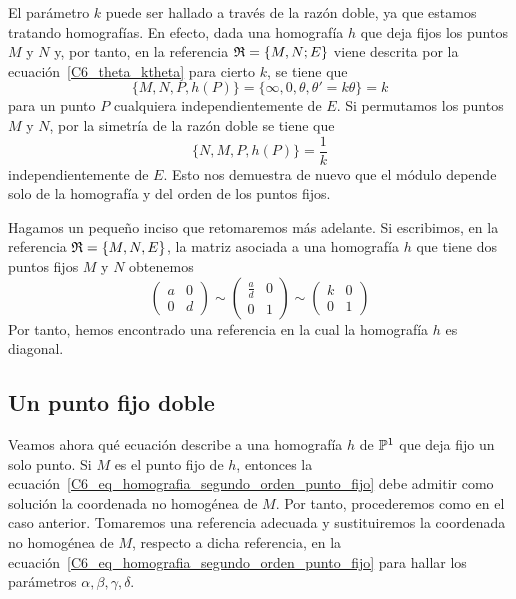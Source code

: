 El parámetro $k$ puede ser hallado a través de la razón doble, ya que estamos tratando homografías. En efecto, dada una homografía $h$ que deja fijos los puntos $M$ y $N$ y, por tanto, en la referencia $\mathfrak{R}=\{M,N;E\}$ viene descrita por la ecuación~\eqref{C6_theta_ktheta} para cierto $k$, se tiene que
\begin{equation}
	\{M,N,P,h(P)\}=\{\infty,0,\theta,\theta'=k\theta\}=k
\end{equation}
para un punto $P$ cualquiera independientemente de $E$. Si permutamos los puntos $M$ y $N$, por la simetría de la razón doble se tiene que
\begin{equation}
	\{N,M,P,h(P)\}=\frac{1}{k}
\end{equation}
independientemente de $E$. Esto nos demuestra de nuevo que el módulo depende solo de la homografía y del orden de los puntos fijos.

Hagamos un pequeño inciso que retomaremos más adelante. Si escribimos, en la referencia $\mathfrak{R}=\{M,N,E\}$, la matriz asociada a una homografía $h$ que tiene dos puntos fijos $M$ y $N$ obtenemos
\begin{equation*}
	\left( \begin{array}{cc}
	a&0\\
	0&d
	\end{array}\right) 
	\sim \left( \begin{array}{cc}
	\frac{a}{d}&0\\
	0&1
	\end{array}\right) 
	\sim \left( \begin{array}{cc}
	k&0\\
	0&1
	\end{array}\right)
\end{equation*}
Por tanto, hemos encontrado una referencia en la cual la homografía $h$ es diagonal.

\subsection{Un punto fijo doble}
Veamos ahora qué ecuación describe a una homografía $h$ de $\mathbb{P}^1$ que deja fijo un solo punto. Si $M$ es el punto fijo de $h$, entonces la ecuación~\eqref{C6_eq_homografia_segundo_orden_punto_fijo} debe admitir como solución la coordenada no homogénea de $M$. Por tanto, procederemos como en el caso anterior. Tomaremos una referencia adecuada y sustituiremos la coordenada no homogénea de $M$, respecto a dicha referencia, en la ecuación~\eqref{C6_eq_homografia_segundo_orden_punto_fijo} para hallar los parámetros $\alpha, \beta,\gamma,\delta$.

